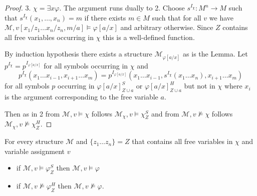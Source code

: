 \documentclass[runningheads]{llncs}
\begin{document}
\begin{proof}
	3. $\chi = \exists x\varphi$. The argument runs dually to 2. Choose $s^{I_\chi}:M^n\to M$ such that $s^{I_\chi}(x_1,\dots, x_n) = m$ if there exists $m\in M$ such that for all $v$ we have $\mathcal M, v[x_1/z_1\dots x_n/z_n, m/a]\models\varphi[a/x]$ and arbitrary otherwise. Since $Z$ contains all free variables occurring in $\chi$ this is a well-defined function.
	
	By induction hypothesis there exists a structure $\mathcal M_{\varphi[a/x]}$ as is the Lemma. Let $p^{I_\chi} = p^{I_{\varphi[a/x]}}$ for all symbols occurring in $\chi$ and $$p^{I_\chi}(x_1\dots x_{i-1}, x_{i+1}\dots x_m) = p^{I_{\varphi[a/x]}}(x_1\dots x_{i-1}, s^{I_\chi}(x_1\dots x_n), x_{i+1}\dots x_m)$$ for all symbols $p$ occurring in $\varphi[a/x]^S_{Z\cup a}$ or $\varphi[a/x]^H_{Z\cup a}$ but not in $\chi$ where $x_i$ is the argument corresponding to the free variable $a$.
	
	Then as in 2 from $\mathcal M, v\models \chi$ follows $\mathcal M_\chi,v\models\chi^S_Z$ and from $\mathcal M, v\not\models \chi$ follows $\mathcal M_\chi,v\not\models\chi^H_Z$.
\end{proof}

\begin{lemma}\label{ap2}
	For every structure $\mathcal M$ and $\{z_1\dots z_n\} = Z$ that contains all free variables in $\chi$ and variable assignment $v$
	\begin{itemize}
		\item if $\mathcal M, v\models\varphi^S_Z$ then $\mathcal M, v\models \varphi$
		\item if $\mathcal M, v\not\models\varphi^H_Z$ then $\mathcal M, v\not\models\varphi$.
	\end{itemize}
\end{lemma}
\end{document}
